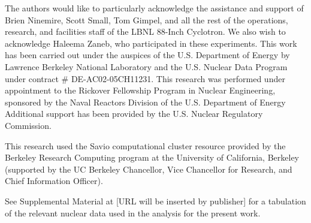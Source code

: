 \documentclass[%
 reprint,
superscriptaddress,
onecolumn,
notitlepage,
 amsmath,amssymb,
 aps,
prc,
]{revtex4-1}
\begin{document}
The authors would like to particularly acknowledge the assistance and support of  Brien Ninemire, Scott Small, Tom Gimpel, and all the rest of the operations, research, and facilities staff of the LBNL 88-Inch Cyclotron.
We also wish to acknowledge Haleema Zaneb, who participated in these experiments.
This work has been carried out  under the auspices of the U.S. Department of Energy by  Lawrence Berkeley National Laboratory and the U.S. Nuclear Data Program under contract \# DE-AC02-05CH11231.
This research was performed under appointment to the Rickover Fellowship Program in Nuclear Engineering, sponsored by the Naval Reactors Division of the U.S. Department of Energy
Additional support has been provided by the U.S. Nuclear Regulatory Commission.




 
This research used the Savio computational cluster resource provided by the Berkeley Research Computing program at the University of California, Berkeley (supported by the UC Berkeley Chancellor, Vice Chancellor for Research, and Chief Information Officer).



\appendix




% 


See Supplemental Material at [URL will be inserted by publisher] for a tabulation of the relevant nuclear data used in the analysis for the present work.
\end{document}
